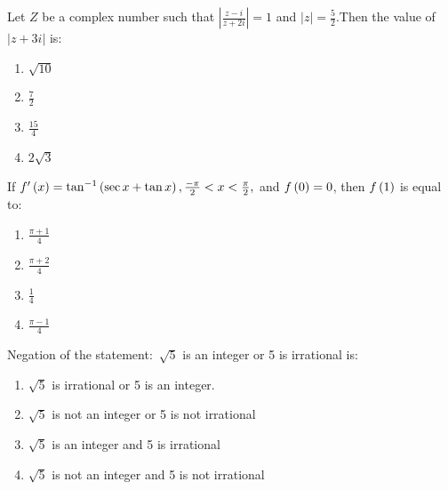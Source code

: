 \item Let $Z$ be a complex number such that $\left\lvert\frac{z-i}{z+2i}\right\rvert=1$ and $\lvert z \rvert=\frac{5}{2}$.Then the value of $\lvert z+3i\rvert$ is$\colon$ \hfill{}
\begin{enumerate}
    \item $\sqrt{10}$
    \item $\frac{7}{2}$
    \item $\frac{15}{4}$
    \item $2\sqrt{3}$
\end{enumerate}
\item If $f^{\prime}\left(x\right)=\tan^{-1}\left(\sec x + \tan x\right),\frac{-\pi}{2}<x<\frac{\pi}{2},$ and $f\left(0\right)=0$, then $f\left(1\right)$ is equal to$\colon$ \hfill{}
\begin{enumerate}
    \item $\frac{\pi+1}{4}$
    \item $\frac{\pi+2}{4}$
    \item $\frac{1}{4}$
    \item $\frac{\pi-1}{4}$
\end{enumerate}
\item Negation of the statement$\colon$ $\sqrt{5}$ is an integer or 5 is irrational is$\colon$ \hfill{}
\begin{enumerate}
    \item $\sqrt{5}$ is irrational or 5 is an integer.
    \item $\sqrt{5}$ is not an integer or 5 is not irrational
    \item $\sqrt{5}$ is an integer and 5 is irrational
    \item $\sqrt{5}$ is not an integer and 5 is not irrational
\end{enumerate}
